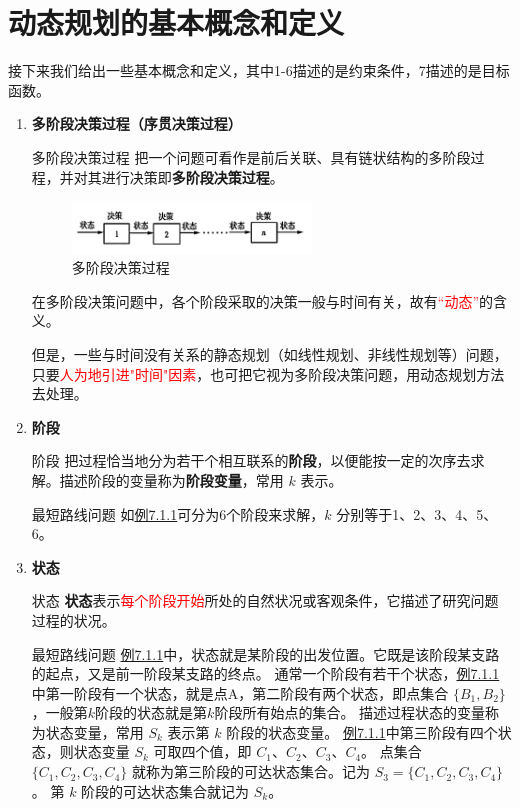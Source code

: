     \section{动态规划的基本概念和定义}
	接下来我们给出一些基本概念和定义，其中1-6描述的是约束条件，7描述的是目标函数。
	\begin{enumerate}
	\item{\textbf{多阶段决策过程（序贯决策过程）}}
	\begin{dfnbox}{多阶段决策过程}{}
	把一个问题可看作是前后关联、具有链状结构的多阶段过程，并对其进行决策即\textbf{多阶段决策过程}。
	\end{dfnbox}
	\begin{figure}[H]
        \centering
        \includegraphics[width=0.6\textwidth]{./image/30.png}
        \caption{多阶段决策过程}
        \label{fig:Chapter4_Temporary_Pavilion_1}
    \end{figure}
在多阶段决策问题中，各个阶段采取的决策一般与时间有关，故有\textcolor{red}{“动态”}的含义。

但是，一些与时间没有关系的静态规划（如线性规划、非线性规划等）问题，只要\textcolor{red}{人为地引进"时间"因素}，也可把它视为多阶段决策问题，用动态规划方法去处理。

\item{\textbf{阶段}}
\begin{dfnbox}{阶段}{}
	把过程恰当地分为若干个相互联系的\textbf{阶段}，以便能按一定的次序去求解。描述阶段的变量称为\textbf{阶段变量}，常用 \( k \) 表示。
\end{dfnbox}
\begin{exbox}{最短路线问题}{}
如\hyperref[eg:7.1.1]{例7.1.1}可分为6个阶段来求解，\( k \) 分别等于1、2、3、4、5、6。
\end{exbox}
\item{\textbf{状态}}
\begin{dfnbox}{状态}{}
	\textbf{状态}表示\textcolor{red}{每个阶段开始}所处的自然状况或客观条件，它描述了研究问题过程的状况。
\end{dfnbox}

\begin{exbox}{最短路线问题}{}
\hyperref[eg:7.1.1]{例7.1.1}中，状态就是某阶段的出发位置。它既是该阶段某支路的起点，又是前一阶段某支路的终点。
通常一个阶段有若干个状态，\hyperref[eg:7.1.1]{例7.1.1}中第一阶段有一个状态，就是点A，第二阶段有两个状态，即点集合 \(\{B_1, B_2\}\)，一般第\( k \)阶段的状态就是第\( k \)阶段所有始点的集合。
描述过程状态的变量称为状态变量，常用 \( S_k \) 表示第 \( k \) 阶段的状态变量。
\hyperref[eg:7.1.1]{例7.1.1}中第三阶段有四个状态，则状态变量 \( S_k \) 可取四个值，即 \( C_1 \)、\( C_2 \)、\( C_3 \)、\( C_4 \)。
点集合 \(\{C_1, C_2, C_3, C_4\}\) 就称为第三阶段的可达状态集合。记为 \( S_3 = \{C_1, C_2, C_3, C_4\} \)。
第 \( k \) 阶段的可达状态集合就记为 \( S_k \)。
\end{exbox}


\end{enumerate}

